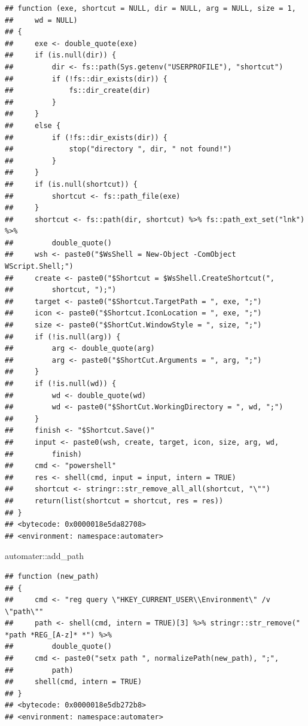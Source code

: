 \documentclass[
]{article}
\newenvironment{Shaded}{\begin{snugshade}}{\end{snugshade}}
\newcommand{\NormalTok}[1]{#1}
\newcommand{\SpecialCharTok}[1]{\textcolor[rgb]{0.00,0.00,0.00}{#1}}
\begin{document}
\begin{verbatim}
## function (exe, shortcut = NULL, dir = NULL, arg = NULL, size = 1, 
##     wd = NULL) 
## {
##     exe <- double_quote(exe)
##     if (is.null(dir)) {
##         dir <- fs::path(Sys.getenv("USERPROFILE"), "shortcut")
##         if (!fs::dir_exists(dir)) {
##             fs::dir_create(dir)
##         }
##     }
##     else {
##         if (!fs::dir_exists(dir)) {
##             stop("directory ", dir, " not found!")
##         }
##     }
##     if (is.null(shortcut)) {
##         shortcut <- fs::path_file(exe)
##     }
##     shortcut <- fs::path(dir, shortcut) %>% fs::path_ext_set("lnk") %>% 
##         double_quote()
##     wsh <- paste0("$WsShell = New-Object -ComObject WScript.Shell;")
##     create <- paste0("$Shortcut = $WsShell.CreateShortcut(", 
##         shortcut, ");")
##     target <- paste0("$Shortcut.TargetPath = ", exe, ";")
##     icon <- paste0("$Shortcut.IconLocation = ", exe, ";")
##     size <- paste0("$ShortCut.WindowStyle = ", size, ";")
##     if (!is.null(arg)) {
##         arg <- double_quote(arg)
##         arg <- paste0("$ShortCut.Arguments = ", arg, ";")
##     }
##     if (!is.null(wd)) {
##         wd <- double_quote(wd)
##         wd <- paste0("$ShortCut.WorkingDirectory = ", wd, ";")
##     }
##     finish <- "$Shortcut.Save()"
##     input <- paste0(wsh, create, target, icon, size, arg, wd, 
##         finish)
##     cmd <- "powershell"
##     res <- shell(cmd, input = input, intern = TRUE)
##     shortcut <- stringr::str_remove_all_all(shortcut, "\"")
##     return(list(shortcut = shortcut, res = res))
## }
## <bytecode: 0x0000018e5da82708>
## <environment: namespace:automater>
\end{verbatim}

\begin{Shaded}
\begin{Highlighting}[]
\NormalTok{automater}\SpecialCharTok{::}\NormalTok{add\_path}
\end{Highlighting}
\end{Shaded}

\begin{verbatim}
## function (new_path) 
## {
##     cmd <- "reg query \"HKEY_CURRENT_USER\\Environment\" /v \"path\""
##     path <- shell(cmd, intern = TRUE)[3] %>% stringr::str_remove(" *path *REG_[A-z]* *") %>% 
##         double_quote()
##     cmd <- paste0("setx path ", normalizePath(new_path), ";", 
##         path)
##     shell(cmd, intern = TRUE)
## }
## <bytecode: 0x0000018e5db272b8>
## <environment: namespace:automater>
\end{verbatim}
\end{document}
